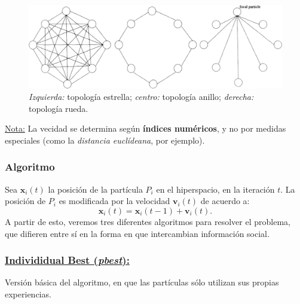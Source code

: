 \documentclass[10pt,a4paper]{article}
\begin{document}
\begin{figure}[ht!]
  \caption{\textit{Izquierda:} topología estrella; \textit{centro:} topología anillo; \textit{derecha:} topología rueda.}
  \label{fig:PSO}
  \centerline{\includegraphics[width=\textwidth-\fboxrule-\fboxrule]{imgs/PSO.png}}
\end{figure}

\underline{Nota:} La vecidad se determina según \textbf{índices numéricos}, y no por medidas especiales (como la \textit{distancia euclídeana}, por ejemplo).

\subsubsection{Algoritmo}

Sea $\mathbf{x}_i(t)$ la posición de la partícula $P_i$ en el hiperspacio, en la iteración $t$. La posición de $P_i$ es modificada por la velocidad $\mathbf{v}_i(t)$ de acuerdo a:
\begin{equation}\label{eq:mov_pso}
\mathbf{x}_i(t) = \mathbf{x}_i(t-1)+\mathbf{v}_i(t).
\end{equation}
A partir de esto, veremos tres diferentes algoritmos para resolver el problema, que difieren entre sí en la forma en que intercambian información social.

\subsubsection*{\underline{Individidual Best (\textit{pbest}):}}

Versión básica del algoritmo, en que las partículas sólo utilizan sus propias experiencias.
\end{document}
